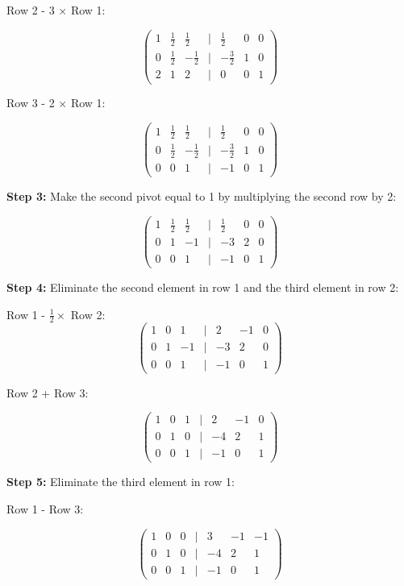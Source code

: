 Row 2 - 3 \(\times\) Row 1:

\[
    \begin{pmatrix}
    1 & \frac{1}{2} & \frac{1}{2} & | & \frac{1}{2} & 0 & 0 \\
    0 & \frac{1}{2} & -\frac{1}{2} & | & -\frac{3}{2} & 1 & 0 \\
    2 & 1 & 2 & | & 0 & 0 & 1
    \end{pmatrix}
\]

Row 3 - 2 \(\times\) Row 1:

\[
    \begin{pmatrix}
    1 & \frac{1}{2} & \frac{1}{2} & | & \frac{1}{2} & 0 & 0 \\
    0 & \frac{1}{2} & -\frac{1}{2} & | & -\frac{3}{2} & 1 & 0 \\
    0 & 0 & 1 & | & -1 & 0 & 1
    \end{pmatrix}
\]

\textbf{Step 3:} Make the second pivot equal to 1 by multiplying the second row by 2:

\[
    \begin{pmatrix}
    1 & \frac{1}{2} & \frac{1}{2} & | & \frac{1}{2} & 0 & 0 \\
    0 & 1 & -1 & | & -3 & 2 & 0 \\
    0 & 0 & 1 & | & -1 & 0 & 1
    \end{pmatrix}
\]

\textbf{Step 4:} Eliminate the second element in row 1 and the third element in row 2:

Row 1 - \(\frac{1}{2} \times\) Row 2:
\[
    \begin{pmatrix}
    1 & 0 & 1 & | & 2 & -1 & 0 \\
    0 & 1 & -1 & | & -3 & 2 & 0 \\
    0 & 0 & 1 & | & -1 & 0 & 1
    \end{pmatrix}
\]

Row 2 + Row 3:

\[
    \begin{pmatrix}
    1 & 0 & 1 & | & 2 & -1 & 0 \\
    0 & 1 & 0 & | & -4 & 2 & 1 \\
    0 & 0 & 1 & | & -1 & 0 & 1
    \end{pmatrix}
\]

\textbf{Step 5:} Eliminate the third element in row 1:

Row 1 - Row 3:

\[
    \begin{pmatrix}
    1 & 0 & 0 & | & 3 & -1 & -1 \\
    0 & 1 & 0 & | & -4 & 2 & 1 \\
    0 & 0 & 1 & | & -1 & 0 & 1
    \end{pmatrix}
\]

